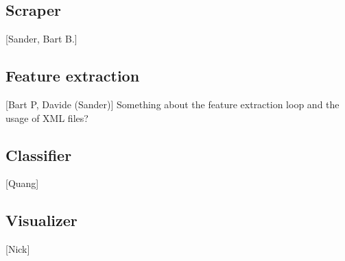 \subsection{Scraper}
[Sander, Bart B.]
\subsection{Feature extraction}
[Bart P, Davide (Sander)]
Something about the feature extraction loop and the usage of XML files?
\subsection{Classifier}
[Quang]
\subsection{Visualizer}
[Nick]
